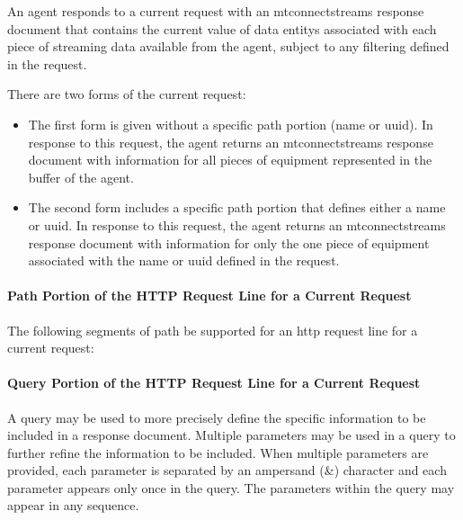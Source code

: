 An \gls{agent} responds to a \gls{current request} with an \gls{mtconnectstreams response document} that contains the current value of \glspl{data entity} associated with each piece of \gls{streaming data} available from the \gls{agent}, subject to any filtering defined in the \gls{request}.

There are two forms of the \gls{current request}:

\begin{itemize}
\item The first form is given without a specific path portion (\gls{name} or \gls{uuid}).  In response to this \gls{request}, the \gls{agent} returns an \gls{mtconnectstreams response document} with information for all pieces of equipment represented in the \gls{buffer} of the \gls{agent}.


\item The second form includes a specific path portion that defines either a \gls{name} or \gls{uuid}.  In response to this \gls{request}, the \gls{agent} returns an \gls{mtconnectstreams response document} with information for only the one piece of equipment associated with the \gls{name} or \gls{uuid} defined in the \gls{request}.

\end{itemize}

\paragraph{Path Portion of the HTTP Request Line for a Current Request}\mbox{}

The following segments of path \MUST be supported for an \gls{http request line} for a \gls{current request}:



\paragraph{Query Portion of the HTTP Request Line for a Current Request}\mbox{}

A \gls{query} may be used to more precisely define the specific information to be included in a \gls{response document}.   Multiple parameters may be used in a \gls{query} to further refine the information to be included.   When multiple parameters are provided, each parameter is separated by an ampersand (\&) character and each parameter appears only once in the \gls{query}.  The parameters within the \gls{query} may appear in any sequence.

